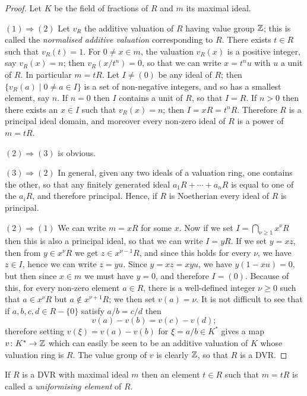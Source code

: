 \begin{proof}
Let $K$ be the field of fractions of $R$ and $m$ its maximal ideal.

$(1) \Rightarrow (2)$ Let $v_R$ the additive valuation of $R$ having value group $\mathbb{Z}$; this is
called the \emph{normalised additive valuation} corresponding to $R$. There exists
$t \in R$ such that $v_R(t) = 1$. For $0 \neq x \in m$, the valuation $v_R(x)$ is a positive
integer, say $v_R(x) = n$; then $v_R(x/t^n) = 0$, so that we can write $x = t^nu$ with $u$ a
unit of $R$. In particular $m = tR$. Let $I \neq (0)$ be any ideal of $R$; then
$\{v_R(a) \mid 0 \neq a \in I\}$ is a set of non-negative integers, and so has a smallest
element, say $n$. If $n = 0$ then $I$ contains a unit of $R$, so that $I = R$. If $n > 0$ then
there exists an $x \in I$ such that $v_R(x) = n$; then $I = xR = t^nR$. Therefore $R$ is a
principal ideal domain, and moreover every non-zero ideal of $R$ is a power
of $m = tR$.

$(2) \Rightarrow (3)$ is obvious.

$(3) \Rightarrow (2)$ In general, given any two ideals of a valuation ring, one contains
the other, so that any finitely generated ideal $a_1R + \cdots + a_nR$ is equal to one
of the $a_iR$, and therefore principal. Hence, if $R$ is Noetherian every ideal of $R$
is principal.

$(2) \Rightarrow (1)$ We can write $m = xR$ for some $x$. Now if we set $I = \bigcap_{\nu \ge 1} x^\nu R$
then this is also a principal ideal, so that we can write $I = yR$. If we set
$y = xz$, then from $y \in x^\nu R$ we get $z \in x^{\nu-1}R$, and since this holds for every
$\nu$, we have $z \in I$, hence we can write $z = yu$. Since $y = xz = xyu$, we have $y(1
- xu) = 0$, but then since $x \in m$ we must have $y = 0$, and therefore $I = (0)$.
Because of this, for every non-zero element $a \in R$, there is a well-defined
integer $\nu \ge 0$ such that $a \in x^\nu R$ but $a \notin x^{\nu+1}R$; we then set $v(a) = \nu$. It is not
difficult to see that if $a, b, c, d \in R - \{0\}$ satisfy $a/b = c/d$ then
\[
  v(a) - v(b) = v(c) - v(d);
\]
therefore setting $v(\xi) = v(a) - v(b)$ for $\xi = a/b \in K^*$ gives a map $v\colon K^* \to \mathbb{Z}$
which can easily be seen to be an additive valuation of $K$ whose valuation
ring is $R$. The value group of $v$ is clearly $\mathbb{Z}$, so that $R$ is a DVR.
\end{proof}

If $R$ is a DVR with maximal ideal $m$ then an element $t \in R$ such that
$m = tR$ is called a \emph{uniformising element} of $R$.

